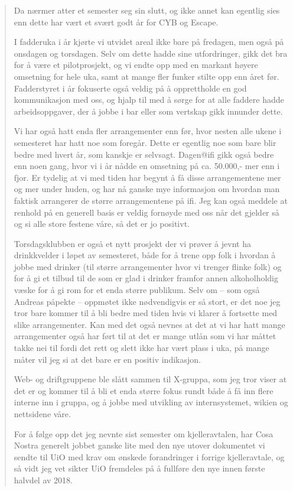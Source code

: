 \documentclass[10pt,norsk,a4paper]{article}
\begin{document}
\begin{quote}
    Da nærmer atter et semester seg sin slutt, og ikke annet kan egentlig sies enn dette har vært et svært godt år for CYB og Escape.

I fadderuka i år kjørte vi utvidet areal ikke bare på fredagen, men også på onsdagen og torsdagen. Selv om dette hadde sine utfordringer, gikk det bra for å være et pilotprosjekt, og vi endte opp med en markant høyere omsetning for hele uka, samt at mange fler funker stilte opp enn året før. Fadderstyret i år fokuserte også veldig på å opprettholde en god kommunikasjon med oss, og hjalp til med å sørge for at alle faddere hadde arbeidsoppgaver, der å jobbe i bar eller som vertskap gikk innunder
dette.

Vi har også hatt enda fler arrangementer enn før, hvor nesten alle ukene i semesteret har hatt noe som foregår. Dette er egentlig noe som bare blir bedre med hvert år, som kanskje er selvsagt. Dagen@ifi gikk også bedre enn noen gang, hvor vi i år nådde en omsetning på ca. 50.000,- mer enn i fjor. Er tydelig at vi med tiden har begynt å få disse arrangementene mer og mer under huden, og har nå ganske mye informasjon om hvordan man faktisk arrangerer de større arrangementene på ifi. Jeg kan også meddele at renhold på en generell basis er veldig fornøyde med oss når det gjelder så og si alle store festene våre, så det er jo positivt.

Torsdagsklubben er også et nytt prosjekt der vi prøver å jevnt ha drinkkvelder i løpet av semesteret, både for å trene opp folk i hvordan å jobbe med drinker (til større arrangementer hvor vi trenger flinke folk) og for å gi et tilbud til de som er glad i drinker framfor annen alkoholholdig væske for å gi rom for et enda større publikum. Selv om – som også Andreas påpekte – oppmøtet ikke nødvendigvis er så stort, er det noe jeg tror bare kommer til å bli bedre med tiden hvis vi klarer å fortsette med slike arrangementer. Kan med det også nevnes at det at vi har hatt mange arrangementer også har ført til at det er mange utlån som vi har måttet takke nei til fordi det rett og slett ikke har vært plass i uka, på mange måter vil jeg si at det bare er en positiv indikasjon.

Web- og driftgruppene ble slått sammen til X-gruppa, som jeg tror viser at det er og kommer til å bli et enda større fokus rundt både å få inn flere interne inn i gruppa, og å jobbe med utvikling av internsystemet, wikien og nettsidene våre.

For å følge opp det jeg nevnte sist semester om kjelleravtalen, har Cosa Nostra generelt jobbet ganske lite med den nye utover dokumentet vi sendte til UiO med krav om ønskede forandringer i forrige kjelleravtale, og så vidt jeg vet sikter UiO fremdeles på å fullføre den nye innen første halvdel av 2018.


\end{quote}
\end{document}
